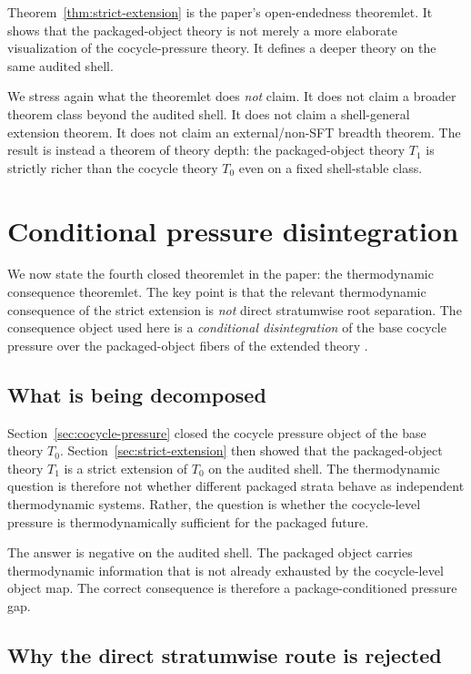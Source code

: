 \documentclass[11pt]{article}
\theoremstyle{definition}
\newcommand{\Tzero}{T_0}
\newcommand{\Tone}{T_1}
\begin{document}
Theorem~\ref{thm:strict-extension} is the paper’s open-endedness theoremlet. It shows that the packaged-object theory is not merely a more elaborate visualization of the cocycle-pressure theory. It defines a deeper theory on the same audited shell.

We stress again what the theoremlet does \emph{not} claim. It does not claim a broader theorem class beyond the audited shell. It does not claim a shell-general extension theorem. It does not claim an external/non-SFT breadth theorem. The result is instead a theorem of theory depth: the packaged-object theory \(\Tone\) is strictly richer than the cocycle theory \(\Tzero\) even on a fixed shell-stable class.
 \section{Conditional pressure disintegration}\label{sec:conditional-disintegration}

We now state the fourth closed theoremlet in the paper: the thermodynamic consequence theoremlet. The key point is that the relevant thermodynamic consequence of the strict extension is \emph{not} direct stratumwise root separation. The consequence object used here is a \emph{conditional disintegration} of the base cocycle pressure over the packaged-object fibers of the extended theory \cite{Rokhlin1949FundamentalIdeas}.

\subsection{What is being decomposed}

Section~\ref{sec:cocycle-pressure} closed the cocycle pressure object of the base theory \(\Tzero\). Section~\ref{sec:strict-extension} then showed that the packaged-object theory \(\Tone\) is a strict extension of \(\Tzero\) on the audited shell. The thermodynamic question is therefore not whether different packaged strata behave as independent thermodynamic systems. Rather, the question is whether the cocycle-level pressure is thermodynamically sufficient for the packaged future.

The answer is negative on the audited shell. The packaged object carries thermodynamic information that is not already exhausted by the cocycle-level object map. The correct consequence is therefore a package-conditioned pressure gap.

\subsection{Why the direct stratumwise route is rejected}
\end{document}
